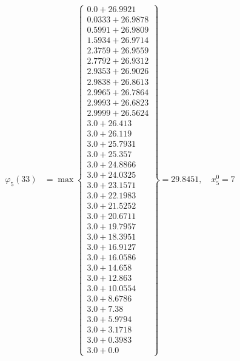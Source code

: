 \documentclass{article}
\begin{document}
\begin{align*}
  
\varphi_{5}(33) &= \max \left\{ \begin{array}{c}
0.0 + 26.9921 \\
 0.0333 + 26.9878 \\
 0.5991 + 26.9809 \\
 1.5934 + 26.9714 \\
 2.3759 + 26.9559 \\
 2.7792 + 26.9312 \\
 2.9353 + 26.9026 \\
 2.9838 + 26.8613 \\
 2.9965 + 26.7864 \\
 2.9993 + 26.6823 \\
 2.9999 + 26.5624 \\
 3.0 + 26.413 \\
 3.0 + 26.119 \\
 3.0 + 25.7931 \\
 3.0 + 25.357 \\
 3.0 + 24.8866 \\
 3.0 + 24.0325 \\
 3.0 + 23.1571 \\
 3.0 + 22.1983 \\
 3.0 + 21.5252 \\
 3.0 + 20.6711 \\
 3.0 + 19.7957 \\
 3.0 + 18.3951 \\
 3.0 + 16.9127 \\
 3.0 + 16.0586 \\
 3.0 + 14.658 \\
 3.0 + 12.863 \\
 3.0 + 10.0554 \\
 3.0 + 8.6786 \\
 3.0 + 7.38 \\
 3.0 + 5.9794 \\
 3.0 + 3.1718 \\
 3.0 + 0.3983 \\
 3.0 + 0.0
\end{array} \right\}=29.8451,\quad x_{5}^0=7\\
  
  
  

\end{align*}
\end{document}
